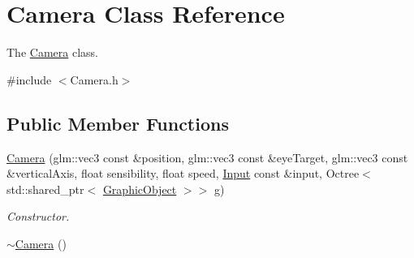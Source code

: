 \hypertarget{classCamera}{}\section{Camera Class Reference}
\label{classCamera}


The \hyperlink{classCamera}{Camera} class.  




{\ttfamily \#include $<$Camera.\+h$>$}

\subsection*{Public Member Functions}
\begin{DoxyCompactItemize}
\item 
\hyperlink{classCamera_a4e0bc7a830bd127815fdb45fc4230768}{Camera} (glm\+::vec3 const \&position, glm\+::vec3 const \&eye\+Target, glm\+::vec3 const \&vertical\+Axis, float sensibility, float speed, \hyperlink{classInput}{Input} const \&input, Octree$<$ std\+::shared\+\_\+ptr$<$ \hyperlink{classGraphicObject}{Graphic\+Object} $>$$>$ g)
\begin{DoxyCompactList}\small\item\em Constructor. \end{DoxyCompactList}\item 
\hypertarget{classCamera_ad1897942d0ccf91052386388a497349f}{}\hyperlink{classCamera_ad1897942d0ccf91052386388a497349f}{$\sim$\+Camera} ()\label{classCamera_ad1897942d0ccf91052386388a497349f}


\end{DoxyCompactItemize}
